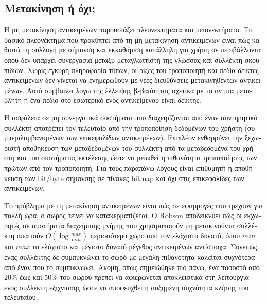 \begin{greek}
\subsection{Μετακίνηση ή όχι;}
Η μη μετακίνηση αντικειμένων παρουσιάζει πλεονεκτήματα και
μειονεκτήματα. Το βασικό πλεονέκτημα που προκύπτει από τη μη
μετακίνηση αντικειμένων είναι πώς καθιστά τη συλλογή με σήμανση
και εκκαθάριση κατάλληλη για χρήση σε περιβάλλοντα όπου δεν 
υπάρχει συνεργασία μεταξύ μεταγλωττιστή της γλώσσας και συλλέκτη
σκουπιδιών. Χωρίς έγκυρη πληροφορία τύπων, οι ρίζες του τροποποιητή
και πεδία δείκτες αντικειμένων δεν γίνεται να ενημερωθούν με 
νέες διευθύνσεις μετακινηθέντων αντικειμένων. Αυτό συμβαίνει 
λόγω της έλλειψης βεβαιότητας σχετικά με το αν μια μεταβλητή 
ή ένα πεδίο στο εσωτερικό ενός αντικείμενου είναι δείκτης. 

Η ασφάλεια σε μη συνεργατικά συστήματα που διαχειρίζονται από
έναν συντηρητικό συλλέκτη αποτρέπει τον τελευταίο από την
τροποποίηση δεδομένων του χρήστη (συμπεριλαμβανομένων των
επικεφαλίδων αντικειμένων). Επιπλέον ενθαρρύνει την ξεχωριστή
αποθήκευση των μεταδεδομένων του συλλέκτη από τα μεταδεδομένα
του χρήστη και του συστήματος εκτέλεσης ώστε να μειωθεί η
πιθανότητα τροποποίησης των πρώτων από τον τροποποιητή. Για 
τους παραπάνω λόγους είναι επιθυμητή η αποθήκευση των bit/byte
σήμανσης σε πίνακες bitmap και όχι στις επικεφαλίδες των
αντικειμένων.

Το πρόβλημα με τη μετακίνηση αντικειμένων είναι πώς σε εφαρμογές
που τρέχουν για πολλή ώρα, ο σωρός τείνει να κατακερματίζεται.
Ο Robson \cite{DBLP:journals/jacm/Robson71, DBLP:journals/jacm/Robson74}
αποδεικνύει πώς οι εκχωρητές σε συστήματα διαχείρισης μνήμης που
χρησιμοποιούν μη μετακινούντα συλλέκτη απαιτούν $O(\log{\frac{max}{min}})$
περισσότερο χώρο από τον ελάχιστο δυνατό, όπου $min$ και $max$
το ελάχιστο και μέγιστο δυνατό μέγεθος αντικειμένων αντίστοιχα.
Συνεπώς ένας συλλέκτης δε συμπυκνώνει το σωρό με μεγάλη πιθανότητα
καλείται συχνότερα από έναν που το συμπυκνώνει. Ακόμη, όπως
σημειώθηκε πιο πάνω, ένα ποσοστό από 20\% έως και 50\% του σωρού
πρέπει να αφιερώνεται αποκλειστικά στη λειτουργία ενός συλλέκτη
εξιχνίασης ώστε να αποφευχθεί η αυξημένη συχνότητα κλήσης του
τελευταίου.


\end{greek}
